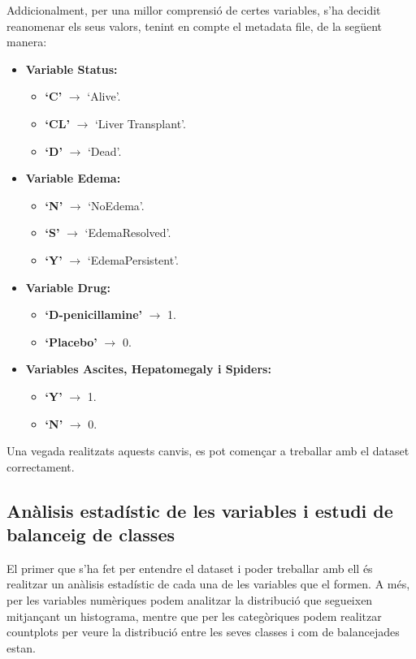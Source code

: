 Addicionalment, per una millor comprensió de certes variables, s'ha decidit reanomenar els seus valors, tenint en compte el metadata file, de la següent manera:
\begin{itemize}
	\item \textbf{Variable Status:}
	\begin{itemize}
		\item \textbf{`C'} $\rightarrow$ `Alive'.
		\item \textbf{`CL'} $\rightarrow$ `Liver Transplant'.
		\item \textbf{`D'} $\rightarrow$ `Dead'.
	\end{itemize}
	
	\item \textbf{Variable Edema:}
	\begin{itemize}
		\item \textbf{`N'} $\rightarrow$ `NoEdema'.
		\item \textbf{`S'} $\rightarrow$ `EdemaResolved'.
		\item \textbf{`Y'} $\rightarrow$ `EdemaPersistent'.
	\end{itemize}
	
	\item \textbf{Variable Drug:}
	\begin{itemize}
		\item \textbf{`D-penicillamine'} $\rightarrow$ 1.
		\item \textbf{`Placebo'} $\rightarrow$ 0.
	\end{itemize}
	
	\item \textbf{Variables Ascites, Hepatomegaly i Spiders:}
	\begin{itemize}
		\item \textbf{`Y'} $\rightarrow$ 1.
		\item \textbf{`N'} $\rightarrow$ 0.
	\end{itemize}
	
	
\end{itemize}

Una vegada realitzats aquests canvis, es pot començar a treballar amb el dataset correctament.

\subsection{Anàlisis estadístic de les variables i estudi de balanceig de classes}
El primer que s'ha fet per entendre el dataset i poder treballar amb ell és realitzar un anàlisis estadístic de cada una de les variables que el formen. A més, per les variables numèriques podem analitzar la distribució que segueixen mitjançant un histograma, mentre que per les categòriques podem realitzar countplots per veure la distribució entre les seves classes i com de balancejades estan.


